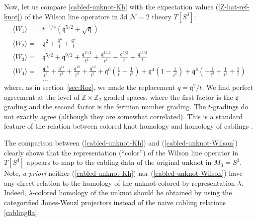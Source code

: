 \documentclass[hyper,letterpaper]{JHEP3}
\newcommand{\Z}{{\mathbb Z}}
\def\frak{\mathfrak}
\def\CN{{\mathcal N}}
\newcommand{\fq}{{\frak q}}
\begin{document}
{Now, let us compare \eqref{cabled-unknot-Kh} with the expectation values (\ref{Z-hat-ref-knot}) of the Wilson line operators
in 3d $\CN=2$ theory $T[S^3]$:
\begin{equation}
 	 \begin{array}{rl}
 	 \langle W_1\rangle=&t^{-1/4}(\mathfrak{q}^{5/2}+\sqrt{\mathfrak{q}}) \\
 	 \langle W_2\rangle=&\mathfrak{q}^2+\frac{\mathfrak{q}^6}{t}+\frac{\mathfrak{q}^4}{t} \\
 	 \langle W_3\rangle=&\mathfrak{q}^{5/2}+\mathfrak{q}^{9/2}+\frac{\mathfrak{q}^{17/2}}{t^2}+\frac{\mathfrak{q}^{21/2}}{t^2}-\frac{\mathfrak{q}^{5/2}}{t}+\frac{\mathfrak{q}^{13/2}}{t} \\
 	 \langle W_4\rangle=& \frac{\mathfrak{q}^{16}}{t^4}+\frac{\mathfrak{q}^{14}}{t^4}+\frac{\mathfrak{q}^{12}}{t^3}+\frac{\mathfrak{q}^{10}}{t^2}+\mathfrak{q}^6 \left(\frac{1}{t}-\frac{1}{t^2}\right)+\mathfrak{q}^4 \left(1-\frac{1}{t^2}\right)+\mathfrak{q}^8 \left(-\frac{1}{t^3}+\frac{1}{t^2}+\frac{1}{t}\right)\\
 	 &\ldots
 	 \end{array}
	 \label{cabled-unknot-Wilson}
 \end{equation}
where, as in section~\ref{sec:Roz}, we made the replacement $q=\fq^2/t$.
We find perfect agreement at the level of $\Z\times \Z_2$ graded spaces,
where the first factor is the $\fq$-grading and the second factor is the fermion number grading.
The $t$-gradings do not exactly agree (although they are somewhat correlated).
This is a standard feature of the relation between colored knot homology
and homology of cablings \cite{khovanov2005categorifications,Gukov:2005qp}.

The comparison between (\ref{cabled-unknot-Kh}) and (\ref{cabled-unknot-Wilson}) clearly shows that the representation (``color'')
of the Wilson line operator in $T[S^3]$ appears to map to the cabling data of the original unknot in $M_3 = S^3$.
Note, {\it a priori} neither (\ref{cabled-unknot-Kh}) nor (\ref{cabled-unknot-Wilson}) have any direct relation
to the homology of the unknot colored by representation $\lambda$.
Indeed, $\lambda$-colored homology of the unknot \cite{Gukov:2011ry,Gorsky:2013jxa}
should be obtained by using the categorified Jones-Wenzl projectors \cite{MR2901969,MR2826934}
instead of the naive cabling relations \eqref{cablingfla}.

}
\end{document}
